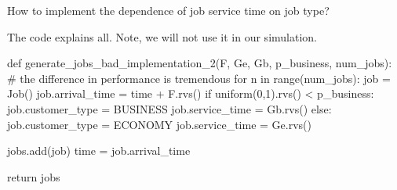 \begin{exercise}
  How to implement the dependence of job service time on job type?

\begin{solution}
The code explains all. Note, we will not use it in our simulation.
\begin{pynotangle}
def generate_jobs_bad_implementation_2(F, Ge, Gb, p_business, num_jobs):
    # the difference in performance is tremendous
    for n in range(num_jobs):
        job = Job()
        job.arrival_time = time + F.rvs()
        if uniform(0,1).rvs() < p_business:
            job.customer_type = BUSINESS
            job.service_time = Gb.rvs()
        else:
            job.customer_type = ECONOMY
            job.service_time = Ge.rvs()

        jobs.add(job)
        time = job.arrival_time

    return jobs
\end{pynotangle}
  \end{solution}
\end{exercise}

